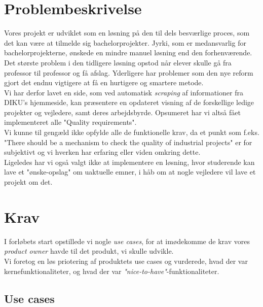 \documentclass[12pt]{article}
\begin{document}
\section{Problembeskrivelse}
\label{sec:problem}
Vores projekt er udviklet som en løsning på den til dels besværlige proces, som det kan være at tilmelde sig bachelorprojekter. Jyrki, som er medansvarlig for bachelorprojekterne, ønskede en mindre manuel løsning end den forhenværende. Det største problem i den tidligere løsning opstod når elever skulle gå fra professor til professor og få afslag. Yderligere har problemer som den nye reform gjort det endnu vigtigere at få en hurtigere og smartere metode. \\
Vi har derfor lavet en side, som ved automatisk \textit{scraping}\cite{scraping} af informationer fra DIKU's hjemmeside, kan præsentere en opdateret visning af de forskellige ledige projekter og vejledere, samt deres arbejdsbyrde. Opsumeret har vi altså fået implementeret alle "Quality requirements". \\
Vi kunne til gengæld ikke opfylde alle de funktionelle krav, da et punkt som f.eks. "There should be a mechanism to check the quality of industrial projects"{} er for subjektivt og vi hverken har erfaring eller viden omkring dette. \\
Ligeledes har vi også valgt ikke at implementere en løsning, hvor studerende kan lave et "ønske-opslag"{} om uaktuelle emner, i håb om at nogle vejledere vil lave et projekt om det.

\section{Krav}
\label{sec:krav}
I forløbets start opstillede vi nogle \textit{use cases}, for at imødekomme de krav vores \textit{product owner} havde til det produkt, vi skulle udvikle. \\
Vi foretog en løs priotering af produktets use cases og vurderede, hvad der var kernefunktionaliteter, og hvad der var \textit{"nice-to-have"}-funktionaliteter.

\subsection*{Use cases}
\end{document}
